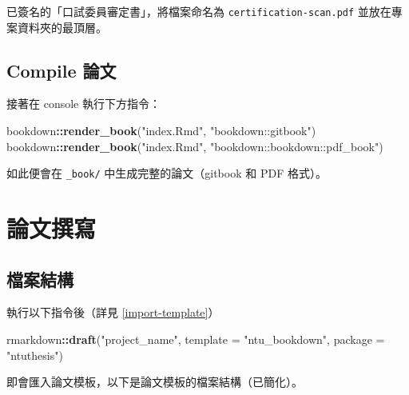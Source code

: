 \documentclass[oneside]{book}
\newenvironment{Shaded}{\begin{snugshade}}{\end{snugshade}}
\newcommand{\DataTypeTok}[1]{\textcolor[rgb]{0.13,0.29,0.53}{#1}}
\newcommand{\KeywordTok}[1]{\textcolor[rgb]{0.13,0.29,0.53}{\textbf{#1}}}
\newcommand{\NormalTok}[1]{#1}
\newcommand{\OperatorTok}[1]{\textcolor[rgb]{0.81,0.36,0.00}{\textbf{#1}}}
\newcommand{\StringTok}[1]{\textcolor[rgb]{0.31,0.60,0.02}{#1}}
\begin{document}
已簽名的「口試委員審定書」，將檔案命名為 \texttt{certification-scan.pdf} 並放在專案資料夾的最頂層。

\hypertarget{compile-thesis}{%
\section{Compile 論文}\label{compile-thesis}}

接著在 console 執行下方指令：

\begin{Shaded}
\begin{Highlighting}[]
\NormalTok{bookdown}\OperatorTok{::}\KeywordTok{render_book}\NormalTok{(}\StringTok{"index.Rmd"}\NormalTok{, }\StringTok{"bookdown::gitbook"}\NormalTok{)}
\NormalTok{bookdown}\OperatorTok{::}\KeywordTok{render_book}\NormalTok{(}\StringTok{"index.Rmd"}\NormalTok{, }\StringTok{"bookdown::bookdown::pdf_book"}\NormalTok{)}
\end{Highlighting}
\end{Shaded}

如此便會在 \texttt{\_book/} 中生成完整的論文（gitbook 和 PDF 格式）。

\hypertarget{write-thesis}{%
\chapter{論文撰寫}\label{write-thesis}}

\hypertarget{dir-structure}{%
\section{檔案結構}\label{dir-structure}}

執行以下指令後（詳見 \ref{import-template}）

\begin{Shaded}
\begin{Highlighting}[]
\NormalTok{rmarkdown}\OperatorTok{::}\KeywordTok{draft}\NormalTok{(}\StringTok{"project_name"}\NormalTok{,}
                 \DataTypeTok{template =} \StringTok{"ntu_bookdown"}\NormalTok{,}
                 \DataTypeTok{package =} \StringTok{"ntuthesis"}\NormalTok{)}
\end{Highlighting}
\end{Shaded}

即會匯入論文模板，以下是論文模板的檔案結構（已簡化）。
\end{document}
